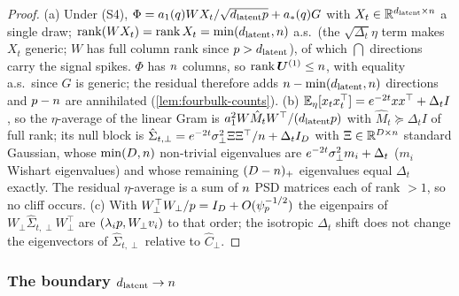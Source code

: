 \begin{proof}
(a) Under (S4), $\Phi=a_1(q)WX_t/\sqrt{d_{\mathrm{latent}}p}+a_*(q)G$ with $X_t\in\mathbb{R}^{d_{\mathrm{latent}}\times n}$ a single draw; $\operatorname{rank}(WX_t)=\operatorname{rank}X_t=\min(d_{\mathrm{latent}},n)$ a.s.\ (the $\sqrt{\Delta_t}\eta$ term makes $X_t$ generic; $W$ has full column rank since $p>d_{\mathrm{latent}}$), of which $\dint$ directions carry the signal spikes. $\Phi$ has $n$ columns, so $\operatorname{rank}\bm{U}^{(1)}\le n$, with equality a.s.\ since $G$ is generic; the residual therefore adds $n-\min(d_{\mathrm{latent}},n)$ directions and $p-n$ are annihilated (\cref{lem:fourbulk-counts}). (b) $\mathbb{E}_\eta[x_tx_t^\top]=e^{-2t}xx^\top+\Delta_tI$, so the $\eta$-average of the linear Gram is $a_1^2W\hat M_tW^\top/(d_{\mathrm{latent}}p)$ with $\hat M_t\succeq\Delta_tI$ of full rank; its null block is $\hat\Sigma_{t,\perp}=e^{-2t}\sigma_{\perp}^2\Xi\Xi^\top/n+\Delta_tI_D$ with $\Xi\in\mathbb{R}^{D\times n}$ standard Gaussian, whose $\min(D,n)$ non-trivial eigenvalues are $e^{-2t}\sigma_{\perp}^2m_i+\Delta_t$ ($m_i$ Wishart eigenvalues) and whose remaining $(D-n)_+$ eigenvalues equal $\Delta_t$ exactly. The residual $\eta$-average is a sum of $n$ PSD matrices each of rank $>1$, so no cliff occurs. (c) With $W_\perp^\top W_\perp/p=I_D+O(\psi_p^{-1/2})$ the eigenpairs of $W_\perp\hat\Sigma_{t,\perp}W_\perp^\top$ are $(\lambda_ip,W_\perp v_i)$ to that order; the isotropic $\Delta_t$ shift does not change the eigenvectors of $\hat\Sigma_{t,\perp}$ relative to $\hat C_\perp$.
\end{proof}

\subsubsection{The boundary $d_{\mathrm{latent}}\to n$}


